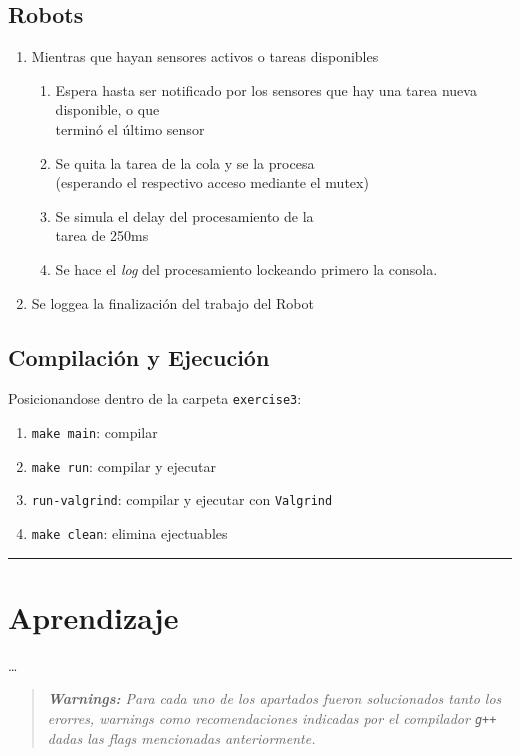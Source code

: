 \documentclass[11pt, a4paper]{article}
\begin{document}
\begin{multicols}{2}
\subsection{Robots}

\begin{enumerate}[label=\Roman*.]
    \item Mientras que hayan sensores activos o tareas disponibles
    \begin{enumerate}[label=\roman*.]
        \item Espera hasta ser notificado por los sensores que hay una tarea nueva disponible, o que\\terminó el último sensor
        \item Se quita la tarea de la cola y se la procesa\\(esperando el respectivo acceso mediante el mutex)
        \item Se simula el delay del procesamiento de la\\tarea de 250ms
        \item Se hace el \textit{log} del procesamiento lockeando primero la consola.
    \end{enumerate}
    \item Se loggea la finalización del trabajo del Robot
\end{enumerate}

\subsection{Compilación y Ejecución}

Posicionandose dentro de la carpeta \lstinline|exercise3|:

\begin{enumerate}[label=\roman*.]
    \item \lstinline|make main|: compilar
    \item \lstinline|make run|: compilar y ejecutar
    \item \lstinline|run-valgrind|: compilar y ejecutar con \lstinline|Valgrind|
    \item \lstinline|make clean|: elimina ejectuables
\end{enumerate}

\end{multicols}

\rule{44em}{0.5pt}

\section*{Aprendizaje}

\dots

\begin{quote}
    \small\itshape\textbf{Warnings:} Para cada uno de los apartados fueron solucionados tanto los erorres, warnings como recomendaciones
indicadas por el compilador \lstinline|g++| dadas las flags mencionadas anteriormente.
\end{quote}
\end{document}
